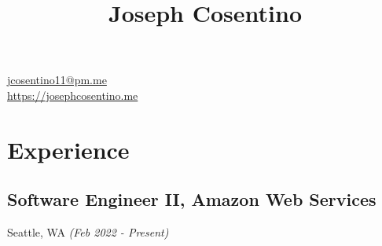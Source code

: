 \documentclass{article}
\title{Joseph Cosentino}
\date{}
\begin{document}
\maketitle

\href{mailto:jcosentino11@pm.me}{jcosentino11@pm.me} \\
\href{https://josephcosentino.me}{https://josephcosentino.me}

\section*{Experience}

\subsection*{Software Engineer II, Amazon Web Services}
Seattle, WA \textit{(Feb 2022 - Present)}
\end{document}
